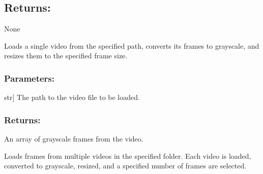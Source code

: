 \documentclass[a4paper,10pt,english]{sphinxmanual}
\begin{document}
\begin{fulllineitems}
\begin{description}
\end{description}


\subsection{Returns:}
\label{\detokenize{datasets:returns}}
\sphinxAtStartPar
None

\begin{fulllineitems}
\label{\detokenize{datasets:fireDiff.Datasets.videodataset.VideoDataset.load_video}}
\pysigstartsignatures
{}
\pysigstopsignatures
\sphinxAtStartPar
Loads a single video from the specified path, converts its frames to
grayscale, and resizes them to the specified frame size.


\subsubsection{Parameters:}
\label{\detokenize{datasets:id2}}\begin{description}
\sphinxlineitem{video\_path}{[}str{]}
\sphinxAtStartPar
The path to the video file to be loaded.

\end{description}


\subsubsection{Returns:}
\label{\detokenize{datasets:id3}}\begin{description}
\sphinxAtStartPar
An array of grayscale frames from the video.

\end{description}

\end{fulllineitems}


\begin{fulllineitems}
\label{\detokenize{datasets:fireDiff.Datasets.videodataset.VideoDataset.load_videos}}
\pysigstartsignatures
{}
\pysigstopsignatures
\sphinxAtStartPar
Loads frames from multiple videos in the specified folder. Each video
is loaded, converted to grayscale, resized, and a specified number of
frames are selected.



\end{fulllineitems}
\end{fulllineitems}
\end{document}
